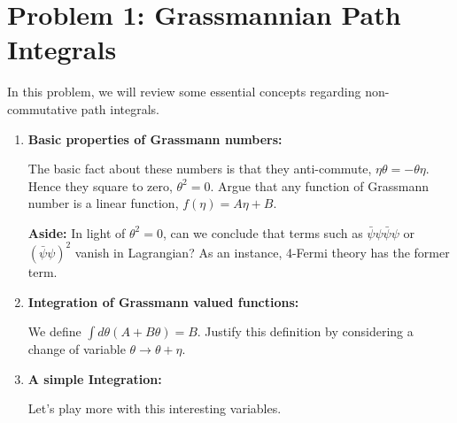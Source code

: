 \documentclass[11pt]{article}
\begin{document}
	
	
	\psetheader
	
	\section*{Problem 1: Grassmannian Path Integrals }
	
	\begin{problem}
		In this problem, we will review some essential concepts regarding non-commutative path integrals.
	\end{problem}
	\begin{enumerate}
		\item
		\begin{problem}{\points[9.5 Peskin]{-}}
			\textbf{Basic properties of Grassmann numbers:}
			
			\noindent
			The basic fact about these numbers is that they anti-commute, $\eta\theta = -\theta \eta$. Hence they square to zero, $\theta^2 = 0$.‌ Argue that any function of Grassmann number is a linear function, $f(\eta) = A\eta+B$.
			
			\noindent
			\textbf{Aside:} In light of $\theta^2=0$, can we conclude that terms such as $\bar{\psi} \psi \bar{\psi} \psi$ or $(\bar{\psi}\psi)^2$ vanish in Lagrangian? As an instance, 4-Fermi theory has the former term.
		\end{problem}
		\item
		\begin{problem}{\points[9.5 Peskin]{-}}
		\textbf{Integration of Grassmann valued functions:}
		
		We define $\int d\theta (A+B\theta) = B$. Justify this definition by considering a change of variable $\theta \xrightarrow{} \theta + \eta$.
		\end{problem}
	\item
	\begin{problem}{\points[9.5 Peskin]{-}}
		\textbf{A simple Integration:}
		
		\noindent
		Let's play more with this interesting variables.


\end{problem}
\end{enumerate}
\end{document}
